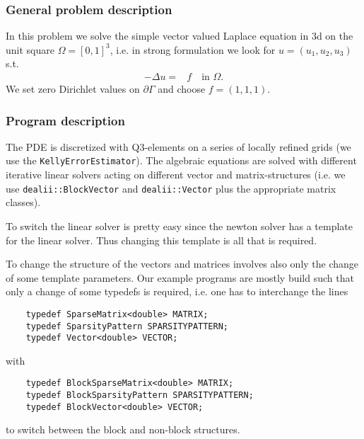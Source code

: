\subsubsection{General problem description}
In this problem we solve the simple vector valued Laplace equation in 3d
on the unit square $\Omega=[0,1]^3$, i.e. in strong formulation we look for $u=(u_1, u_2, u_3)$ s.t.
\begin{align*}
-\Delta u =& f \quad\text{in }\Omega.
\end{align*}
We set zero Dirichlet values on $\partial \Gamma$ and choose $f=(1,1,1)$.
\subsubsection{Program description}
The PDE is discretized with Q3-elements on a series of locally refined grids (we use the \texttt{KellyErrorEstimator}). The algebraic equations are solved with  different iterative linear solvers acting on different vector and matrix-structures (i.e. we use \texttt{dealii::BlockVector} and \texttt{dealii::Vector} plus the appropriate matrix classes). 

To switch the linear solver is pretty easy since the newton solver has a template for the linear solver. Thus changing this template is all that is required. 

To change the structure of the vectors and matrices involves also only the change of some template parameters. Our example programs are mostly build such that only a change of some typedefs is required, i.e. one has to interchange the lines
\begin{verbatim}
	typedef SparseMatrix<double> MATRIX;
	typedef SparsityPattern SPARSITYPATTERN;
	typedef Vector<double> VECTOR;
\end{verbatim}
with
\begin{verbatim}
	typedef BlockSparseMatrix<double> MATRIX;
	typedef BlockSparsityPattern SPARSITYPATTERN;
	typedef BlockVector<double> VECTOR;
\end{verbatim}
to switch between the block and non-block structures.

